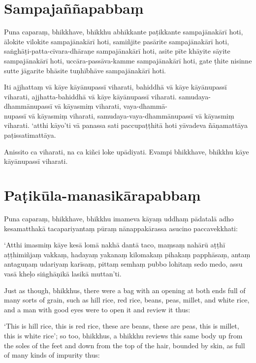 \paliPage
\section*{Sampajaññapabbaṃ}

Puna caparaṃ, bhikkhave, bhikkhu abhikkante paṭikkante sampajānakārī hoti, ālokite
vilokite sampajānakārī hoti, samiñjite pasārite sampajānakārī hoti,
saṅghāṭi-patta-cīvara-dhāraṇe sampajānakārī hoti, asite pīte khāyite sāyite
sampajānakārī hoti, uccāra-passāva-kamme sampajānakārī hoti, gate ṭhite nisinne
sutte jāgarite bhāsite tuṇhībhāve sampajānakārī hoti.

Iti ajjhattaṃ vā kāye kāyānupassī viharati, bahiddhā vā kāye kāyānupassī
viharati, ajjhatta-bahiddhā vā kāye kāyānupassī viharati. samudaya-dhammānupassī
vā kāyasmiṃ viharati, vaya-dhammā-\\
nupassī vā kāyasmiṃ viharati, samudaya-vaya-dhammānupassī vā kāyasmiṃ viharati.
‘atthi kāyo’ti vā panassa sati paccupaṭṭhitā hoti yāvadeva ñāṇamattāya
paṭissatimattāya.

Anissito ca viharati, na ca kiñci loke upādiyati. Evampi bhikkhave, bhikkhu kāye
kāyānupassī viharati.


\section*{Paṭikūla-manasikārapabbaṃ}

Puna caparaṃ, bhikkhave, bhikkhu imameva kāyaṃ uddhaṃ pādatalā adho kesamatthakā
tacapariyantaṃ pūraṃ nānappakārassa asucino paccavekkhati:

‘Atthi imasmiṃ kāye kesā lomā nakhā dantā taco, maṃsaṃ nahārū aṭṭhī aṭṭhimiñjaṃ
vakkaṃ, hadayaṃ yakanaṃ kilomakaṃ pihakaṃ papphāsaṃ, antaṃ antaguṇaṃ udariyaṃ
karīsaṃ, pittaṃ semhaṃ pubbo lohitaṃ sedo medo, assu vasā kheḷo siṅghāṇikā lasikā
muttan’ti.

\englishPage

Just as though, bhikkhus, there were a bag with an opening at both ends full of
many sorts of grain, such as hill rice, red rice, beans, peas, millet, and white
rice, and a man with good eyes were to open it and review it thus:

‘This is hill rice, this is red rice, these are beans, these are peas, this is
millet, this is white rice’; so too, bhikkhus, a bhikkhu reviews this same body
up from the soles of the feet and down from the top of the hair, bounded by
skin, as full of many kinds of impurity thus:

